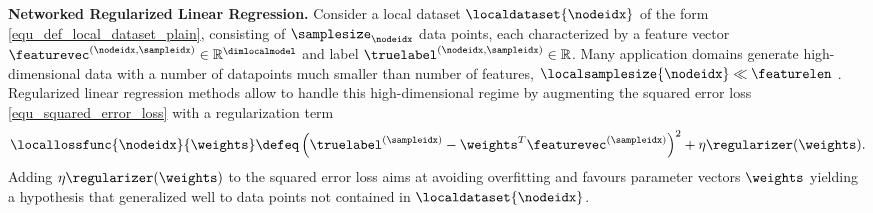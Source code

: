 \documentclass[lettersize,journal]{IEEEtran}
\begin{document}
%


{\bf Networked Regularized Linear Regression.} %
Consider a local dataset $\localdataset{\nodeidx}$ of the form \eqref{equ_def_local_dataset_plain}, 
consisting of $\samplesize_{\nodeidx}$ data points, each characterized by a feature vector 
$\featurevec^{(\nodeidx,\sampleidx)} \in \mathbb{R}^{\dimlocalmodel}$ and label $\truelabel^{(\nodeidx,\sampleidx)} \in \mathbb{R}$. 
Many application domains generate high-dimensional data with a number of datapoints much smaller than 
number of features, $\localsamplesize{\nodeidx} \ll \featurelen$ \cite{BuhlGeerBook,HastieWainwrightBook}. 
Regularized linear regression methods allow to handle this high-dimensional regime by 
augmenting the squared error loss \eqref{equ_squared_error_loss} with a regularization term \cite[Ch. 7]{MLBasics}
\begin{equation} 
	\label{equ_def_regularized_loss}
\locallossfunc{\nodeidx}{\weights} \defeq \left(\truelabel^{(\sampleidx)} -  \weights^{T} \featurevec^{(\sampleidx)}  \right)^{2} + \eta \regularizer(\weights). 
\end{equation} 
Adding $\eta \regularizer(\weights)$ to the squared error loss aims at avoiding overfitting and 
favours  parameter vectors $\weights$ yielding a hypothesis that generalized well to data points not 
contained in $\localdataset{\nodeidx}$. 
\end{document}
